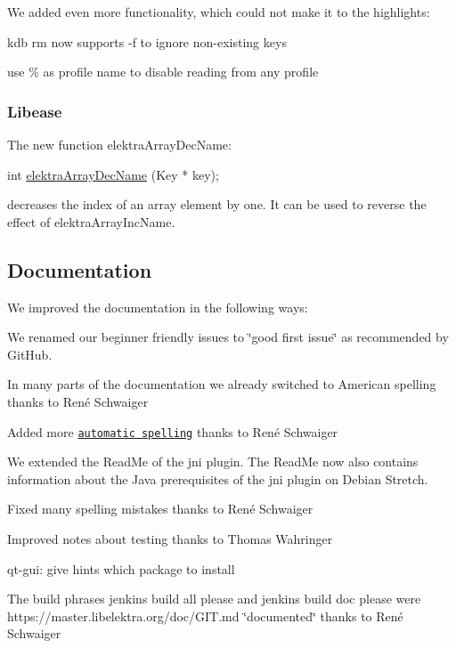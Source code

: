 We added even more functionality, which could not make it to the highlights\+:


\begin{DoxyItemize}
\item {\ttfamily kdb rm} now supports {\ttfamily -\/f} to ignore non-\/existing keys
\item use {\ttfamily \%} as profile name to disable reading from any profile
\end{DoxyItemize}

\subsubsection*{Libease}


\begin{DoxyItemize}
\item The new function {\ttfamily elektra\+Array\+Dec\+Name}\+:
\end{DoxyItemize}


\begin{DoxyCode}
\textcolor{keywordtype}{int} \hyperlink{array_8c_a4376537e9d6545dd26afe0c6c62dd9ed}{elektraArrayDecName} (Key * key);
\end{DoxyCode}


decreases the index of an array element by one. It can be used to reverse the effect of {\ttfamily elektra\+Array\+Inc\+Name}.

\subsection*{Documentation}

We improved the documentation in the following ways\+:


\begin{DoxyItemize}
\item We renamed our beginner friendly issues to \char`\"{}good first issue\char`\"{} as recommended by Git\+Hub.
\item In many parts of the documentation we already switched to American spelling thanks to René Schwaiger
\item Added more \href{https://master.libelektra.org/scripts/sed}{\tt automatic spelling} thanks to René Schwaiger
\item We extended the Read\+Me of the {\ttfamily jni} plugin. The Read\+Me now also contains information about the Java prerequisites of the {\ttfamily jni} plugin on Debian Stretch.
\item Fixed many spelling mistakes thanks to René Schwaiger
\item Improved notes about testing thanks to Thomas Wahringer
\item qt-\/gui\+: give hints which package to install
\item The build phrases {\ttfamily jenkins build all please} and {\ttfamily jenkins build doc please} were https\+://master.libelektra.\+org/doc/\+G\+IT.md \char`\"{}documented\char`\"{} thanks to René Schwaiger
\end{DoxyItemize}

